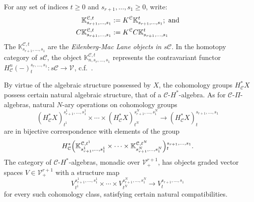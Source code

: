 \documentclass[11pt]{amsart} \renewcommand{\baselinestretch}{1.2}
\theoremstyle{plain}
\numberwithin{equation}{section} %
\theoremstyle{plain}
\numberwithin{equation}{chapter} %
\newcommand{\DASH}{\mathrm{-}}
\renewcommand{\to}{\longrightarrow}
\newcommand{\calV}{\mathcal{V}}
\newcommand{\calc}{\mathcal{C}}
\newcommand{\vect}[2]{\calV^{#1}_{#2}}
\begin{document}
\begin{Pi-algebras and cohomology algebras}
For any set of indices $t\geq0$ and $s_{r+1},\ldots,s_1\geq0$, write:
\begin{alignat*}{2}
\mathbb{K}^{\calc,t}_{s_{r+1},\ldots,s_1}
&:=
K^\calc \mathbb{K}^{t}_{s_{r+1},\ldots,s_1};\textup{ and}
\\
C\mathbb{K}^{\calc,t}_{s_{r+1},\ldots,s_1}
&:=
K^\calc C\mathbb{K}^{t}_{s_{r+1},\ldots,s_1}%
\end{alignat*}
The $\mathbb{K}^{\calc,t}_{s_{r+1},\ldots,s_1}$ are the \emph{Eilenberg-Mac Lane objects in $s\calc$}. In the homotopy category of $s\calc$, the object $\mathbb{K}^{\calc,t}_{n,s_r,\ldots,s_1}$ represents the contravariant functor $H^n_{\calc}(\DASH)_t^{s_r,\ldots,s_1}:s\calc\to\vect{}{}$,  c.f.\ \cite[Proposition 4.3]{MR1089001}. 




By virtue of the algebraic structure possessed by $X$, the cohomology groups $H_\calc^*X$ possess certain natural algebraic structure, that of a $\calc$-$H^*$-algebra.  As for $\calc$-$\Pi$-algebras, natural $N$-ary operations on cohomology groups
\begin{equation}\label{operationseqn4}
(H^*_\calc X)^{s_{r+1}^{1},\ldots,s_{1}^{1}}_{t^1}\times\cdots \times(H^*_\calc X)^{s_{r+1}^{N},\ldots,s_{1}^{N}}_{t^N}\to (H^*_\calc X)^{s_{r+1},\ldots,s_{1}}_{t}\end{equation}
are in bijective correspondence with elements of the group
\begin{equation}\label{operationseqn5}
 H^*_\calc\Bigl(\mathbb{K}_{s_{r+1}^{1},\ldots,s_{1}^{1}}^{\calc,t^1}\times\cdots\times \mathbb{K}_{s_{r+1}^{N},\ldots,s_{1}^{N}}^{\calc,t^N}\Bigr)\makebox[0cm][l]{}^{s_{r+1},\ldots,s_{1}}_{t}.\end{equation}
The category of $\calc$-$H^*$-algebras, monadic over $\vect{r+1}{+}$, has objects graded vector spaces $V\in\vect{r+1}{+}$ with a structure map 
\begin{equation}\label{operationseqn6}
V^{s_{r+1}^{1},\ldots,s_{1}^{1}}_{t^1}\times\cdots \times V^{s_{r+1}^{N},\ldots,s_{1}^{N}}_{t^N}\to V^{s_{r+1},\ldots,s_{1}}_{t}\end{equation}
for every such cohomology class, satisfying certain natural compatibilities.


\end{Pi-algebras and cohomology algebras}
\end{document}
